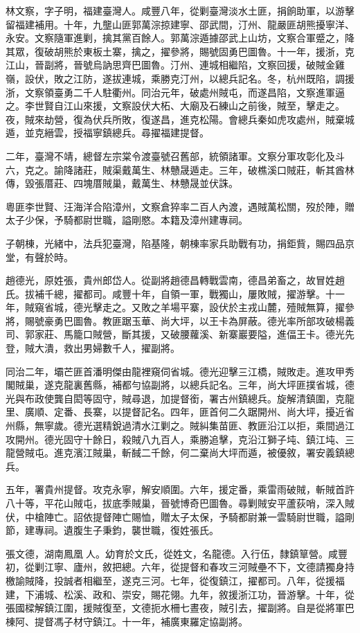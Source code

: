 \begin{pinyinscope}
林文察，字子明，福建臺灣人。咸豐八年，從剿臺灣淡水土匪，捐餉助軍，以游擊留福建補用。十年，九壟山匪郭萬淙掠建寧、邵武間，汀州、龍嚴匪胡熊擾寧洋、永安。文察隨軍進剿，擒其黨百餘人。郭萬淙遁據邵武上山坊，文察合軍蹙之，降其眾，復破胡熊於東板土寨，擒之，擢參將，賜號固勇巴圖魯。十一年，援浙，克江山，晉副將，晉號烏訥思齊巴圖魯。汀州、連城相繼陷，文察回援，破賊金雞嶺，設伏，敗之江防，遂拔連城，乘勝克汀州，以總兵記名。冬，杭州既陷，調援浙，文察領臺勇二千人駐衢州。同治元年，破處州賊屯，而遂昌陷，文察進軍逼之。李世賢自江山來援，文察設伏大柘、大廟及石練山之前後，賊至，擊走之。夜，賊來劫營，復為伏兵所敗，復遂昌，進克松陽。會總兵秦如虎攻處州，賊棄城遁，並克縉雲，授福寧鎮總兵。尋擢福建提督。

二年，臺灣不靖，總督左宗棠令渡臺號召舊部，統領諸軍。文察分軍攻彰化及斗六，克之。諭降諸莊，賊渠戴萬生、林戇晟遁走。三年，破樵溪口賊莊，斬其酋林傳，毀張厝莊、四塊厝賊巢，戴萬生、林戇晟並伏誅。

粵匪李世賢、汪海洋合陷漳州，文察倉猝率二百人內渡，遇賊萬松關，歿於陣，贈太子少保，予騎都尉世職，謚剛愍。本籍及漳州建專祠。

子朝棟，光緒中，法兵犯臺灣，陷基隆，朝棟率家兵助戰有功，捐鉅貲，賜四品京堂，有聲於時。

趙德光，原姓張，貴州郎岱人。從副將趙德昌轉戰雲南，德昌弟畜之，故冒姓趙氏。拔補千總，擢都司。咸豐十年，自領一軍，戰獨山，屢敗賊，擢游擊。十一年，賊窺省城，德光擊走之。又敗之羊場平寨，設伏於主戎山麓，殪賊無算，擢參將，賜號豪勇巴圖魯。教匪踞玉華、尚大坪，以王卡為屏蔽。德光率所部攻破楊義司、郭家莊、馬籠口賊營，斷其援，又破腰蘿溪、新寨巖要隘，進偪王卡。德光先登，賊大潰，救出男婦數千人，擢副將。

同治二年，壩芒匪首潘明傑由龍裡窺伺省城。德光迎擊三江橋，賊敗走。進攻甲秀閣賊巢，遂克龍裏舊縣，補都勻協副將，以總兵記名。三年，尚大坪匪撲省城，德光與布政使龔自閎等固守，賊尋退，加提督銜，署古州鎮總兵。旋解清鎮圍，克龍里、廣順、定番、長寨，以提督記名。四年，匪首何二久踞開州、尚大坪，擾近省州縣，無寧歲。德光選精銳過清水江剿之。賊糾集苗匪、教匪沿江以拒，乘間過江攻開州。德光固守十餘日，殺賊八九百人，乘勝追擊，克沿江獅子坉、鎮江坉、三龍營賊屯。進克濱江賊巢，斬馘二千餘，何二棄尚大坪而遁，被優敘，署安義鎮總兵。

五年，署貴州提督。攻克永寧，解安順圍。六年，援定番，乘雷雨破賊，斬賊首許八十等，平花山賊屯，拔底季賊巢，晉號博奇巴圖魯。尋剿賊安平蘆荻哨，深入賊伏，中槍陣亡。詔依提督陣亡賜恤，贈太子太保，予騎都尉兼一雲騎尉世職，謚剛節，建專祠。遺腹生子秉鈞，襲世職，復姓張氏。

張文德，湖南鳳凰人。幼育於文氏，從姓文，名龍德。入行伍，隸鎮筸營。咸豐初，從剿江寧、廬州，敘把總。六年，從提督和春攻三河賊壘不下，文德請獨身持檄諭賊降，投誠者相繼至，遂克三河。七年，從復鎮江，擢都司。八年，從援福建，下浦城、松溪、政和、崇安，賜花翎。九年，敘援浙江功，晉游擊。十年，從張國樑解鎮江圍，援賊復至，文德扼水柵七晝夜，賊引去，擢副將。自是從將軍巴棟阿、提督馮子材守鎮江。十一年，補廣東羅定協副將。


\end{pinyinscope}
